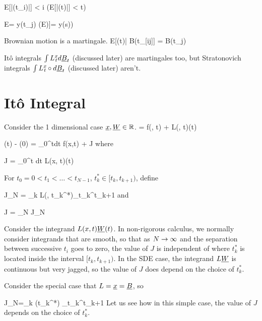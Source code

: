 \beq
E[\;|\rvy(t_i)|\;] < \infty\quad \forall i\quad
(E[\;|\rvy(t)|\;] < \infty \quad \forall t)
\eeq


\beq
E= y(t_j)
\quad (E\left[\rvy(t)|x([0,s])\right]= y(s))
\eeq


Brownian motion is a martingale.
\beq
E[\rvB(t)| B(t_{[i\upto j]}] = B(t_j)
\eeq


It\^{o} integrals $\int L\XT{x}{t}d\rvB_t$ (discussed later)
are martingales too, but Stratonovich integrals
$\int L\XT{x}{t}\circ d\rvB_t$
(discussed later)
aren't.





\section{It\^{o} Integral}

Consider the 1 dimensional case $\rvx, \rvW\in \RR$.
\beq
{}= f(\rvx, t) + L(\rvx, t)\rvW(t)
\eeq

\beq
\rvx(t) - \rvx(0) =
\int_{0}^{t}dt\; f(x,t) + J
\eeq
where

\beq
J = \int_{0}^t dt\;
L(x, t)\rvW(t)
\eeq

For $t_0=0 < t_1 <\ldots <t_{N-1}$, $t_k^*\in [t_k, t_{k+1})$, define



\beq
J_N =
\sum_k L(\rvx, t_k^*)\Delta_{t_k}^{t_{k+1}}\rvB
\eeq
and

\beq
J = \lim_{N\rarrow \infty} J_N
\eeq

Consider the integrand $L(x,t)\rvW(t)$.
In non-rigorous calculus,
we normally consider integrands
that are smooth, so that as $N\rightarrow \infty$
and the separation between successive $t_i$
goes to zero,
the value of $J$
is independent of where $t^*_k$
is located inside the interval $[t_k, t_{k+1})$.
In the SDE case, the integrand $L\rvW$ is continuous
but very jagged, so the value of $J$ does
depend on the choice of $t^*_k$.

Consider the special case that
$L=\rvx=\rvB$, so

\beq
J_N=\sum_k \rvB(t_k^*) \Delta_{t_k}^{t_{k+1}}\rvB
\eeq
Let us see how in this simple case,
the value of $J$ depends on the
choice of $t^*_k$.

